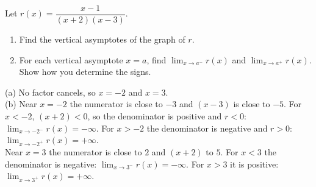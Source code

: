 \begin{exo}{}
Let $r(x)=\dfrac{x-1}{(x+2)(x-3)}$.
\begin{enumerate}[label=(\alph*)]
\item Find the vertical asymptotes of the graph of $r$.
\item For each vertical asymptote $x=a$, find $\displaystyle\lim_{x\to a^-}r(x)$ and $\displaystyle\lim_{x\to a^+}r(x)$. Show how you determine the signs.
\end{enumerate}
\begin{solution}
(a) No factor cancels, so $x=-2$ and $x=3$.\\
(b) Near $x=-2$ the numerator is close to $-3$ and $(x-3)$ is close to $-5$. For $x<-2$, $(x+2)<0$, so the denominator is positive and $r<0$: $\lim_{x\to-2^-}r(x)=-\infty$. For $x>-2$ the denominator is negative and $r>0$: $\lim_{x\to-2^+}r(x)=+\infty$.\\
Near $x=3$ the numerator is close to $2$ and $(x+2)$ to $5$. For $x<3$ the denominator is negative: $\lim_{x\to3^-}r(x)=-\infty$. For $x>3$ it is positive: $\lim_{x\to3^+}r(x)=+\infty$.
\end{solution}
\end{exo}

